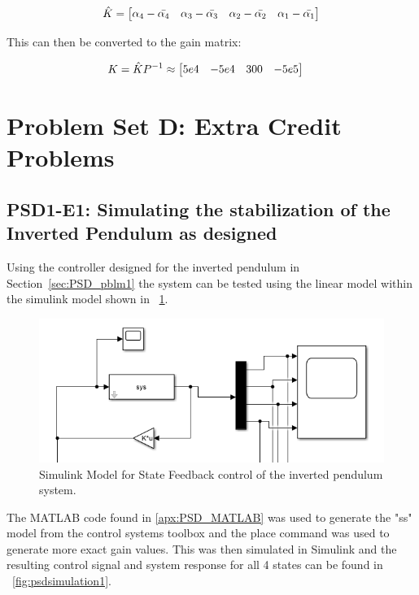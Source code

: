 \documentclass[]{article}
\newcommand{\sectionname}{Section}
\begin{document}
		\begin{equation}
			\hat{K} = \mqty[\alpha_4 - \bar{\alpha_4} & \alpha_3 - \bar{\alpha_3} & \alpha_2 - \bar{\alpha_2} & \alpha_1 - \bar{\alpha_1}]
		\end{equation}
		
		This can then be converted to the gain matrix:
		
		\begin{equation}
			\begin{aligned}
				K &= \hat{K} P^{-1} \approx \mqty[5e4&-5e4&300&-5e5] 
			\end{aligned}
		\end{equation}





\newpage
\appendix

\section{Problem Set D: Extra Credit Problems}

	\subsection{PSD1-E1: Simulating the stabilization of the Inverted Pendulum as designed}
		Using the controller designed for the inverted pendulum in \sectionname \ \ref{sec:PSD_pblm1} the system can be tested using the linear model within the simulink model shown in \figurename \ \ref{fig:psdsimulinkmodel1}.
		
		\begin{figure}[h]
			\centering
			\includegraphics[width=1\linewidth]{Fig/PSD_SimulinkModel_1}
			\caption{Simulink Model for State Feedback control of the inverted pendulum system.}
			\label{fig:psdsimulinkmodel1}
		\end{figure}
		
		The MATLAB code found in \appendixname \ref{apx:PSD_MATLAB} was used to generate the "ss" model from the control systems toolbox and the place command was used to generate more exact gain values. This was then simulated in Simulink and the resulting control signal and system response for all 4 states can be found in \figurename \ \ref{fig:psdsimulation1}.
		
\end{document}
